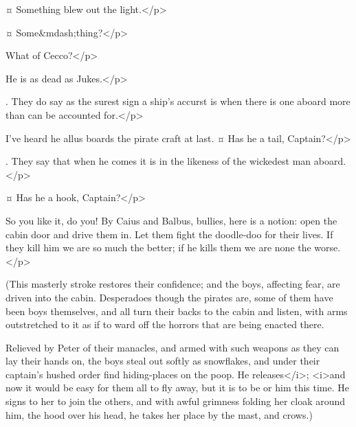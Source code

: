 \begin{drama}
\hookspeaks {}¤
Something blew out the light.</p>

\mullinsspeaks {}¤
Some&mdash;thing?</p>

\noodlerspeaks
What of Cecco?</p>

\hookspeaks
He is as dead as Jukes.</p>


\cooksonspeaks.
They do say as the surest sign a ship's accurst is when there is one aboard more than can be accounted for.</p>

\noodlerspeaks
I've heard he allus boards the pirate craft at last.
¤
Has he a tail, Captain?</p>

\mullinsspeaks.
They say that when he comes it is in the likeness of the wickedest man aboard.</p>

\cooksonspeaks {}¤
Has he a hook, Captain?</p>


\hookspeaks
So you like it, do you!
By Caius and Balbus, bullies, here is a notion: open the cabin door and drive them in.
Let them fight the doodle-doo for their lives.
If they kill him we are so much the better; if he kills them we are none the worse.</p>

\begin{stagedir}
(This masterly stroke restores their confidence; and the boys, affecting fear, are driven into the cabin.
Desperadoes though the pirates are, some of them have been boys themselves, and all turn their backs to the cabin and listen, with arms outstretched to it as if to ward off the horrors that are being enacted there.

Relieved by Peter of their manacles, and armed with such weapons as they can lay their hands on, the boys steal out softly as snowflakes, and under their captain's hushed order find hiding-places on the poop.
He releases</i>\wendy; <i>and now it would be easy for them all to fly away, but it is to be \hook or him this time.
He signs to her to join the others, and with awful grimness folding her cloak around him, the hood over his head, he takes her place by the mast, and crows.)
\end{stagedir}


\end{drama}
